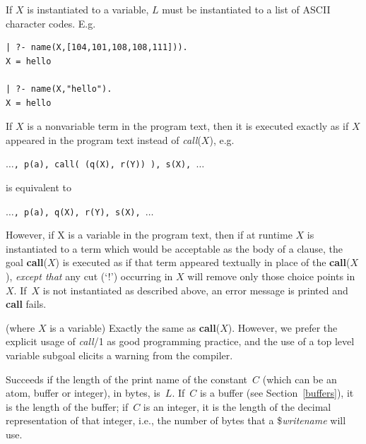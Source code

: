 \begin{description}
    If $X$ is instantiated to a variable,
    $L$ must be instantiated to a list of ASCII character codes.
    E.g.
\begin{center}
\begin{minipage}{3in}
\begin{verbatim}
| ?- name(X,[104,101,108,108,111])).
X = hello

| ?- name(X,"hello").
X = hello
\end{verbatim}
\end{minipage}
\end{center}

\item[{\bf call}({\em X})] 
    If $X$ is a nonvariable term in the program text,
    then it is executed exactly as if $X$ appeared in the program text
    instead of {\em call}($X$\/),
    e.g.
\begin{center}
{\tt $\ldots$, p(a), call( (q(X), r(Y)) ), s(X), $\ldots$}
\end{center}
is equivalent to
\begin{center}
{\tt $\ldots$, p(a), q(X), r(Y), s(X), $\ldots$}
\end{center}
    However, if X is a variable in the program text,
    then if at runtime $X$ is instantiated to a term which would be acceptable
    as the body of a clause, the goal {\bf call}($X$) is executed as if that
    term appeared textually in place of the {\bf call}($X$),
    {\em except that} any cut (`!')
    occurring in $X$ will remove only those choice points in~$X$.
    If~$X$ is not instantiated as described above,
    an error message is printed and {\bf call} fails.

\item[{\em X}]
    (where $X$ is a variable) Exactly the same as {\bf call}($X$).
    However, we prefer the explicit usage of {\em call}/1
    as good programming practice,
    and the use of a top level variable subgoal elicits
    a warning from the compiler.

\item[{\bf conlength}($C$, $L$)]
    Succeeds if the length of the print name of the constant~$C$
    (which can be an atom, buffer or integer), in bytes, is~$L$.
    If~$C$ is a buffer (see Section~\ref{buffers}),
    it is the length of the buffer; if~$C$ is an integer,
    it is the length of the decimal representation of that integer,
    i.e., the number of bytes that a \${\em writename} will use.
\end{description}

